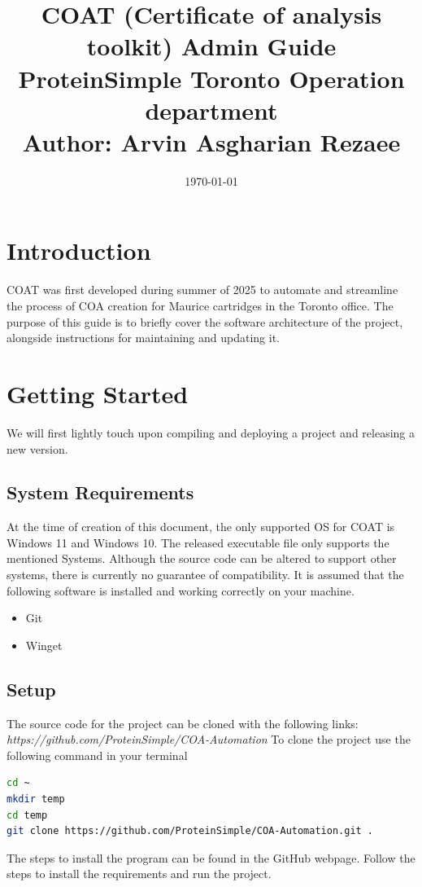 \documentclass[12pt,a4paper]{article}
\title{
  \Huge \textbf{
    COAT (Certificate of analysis toolkit) Admin Guide} \\
    \vspace{1em}
  \large ProteinSimple Toronto Operation department \\
  \large Author: Arvin Asgharian Rezaee
  }
\author{}
\date{\today}
\begin{document}
\maketitle
\thispagestyle{empty}
\clearpage

\tableofcontents
\clearpage

\section{Introduction}
COAT was first developed during summer of 2025 to automate and streamline the process of COA creation
for Maurice cartridges in the Toronto office. The purpose of this guide is to briefly cover the 
software architecture of the project, alongside instructions for maintaining and updating it.
\section{Getting Started}
We will first lightly touch upon compiling and deploying a project and releasing a new version.
\subsection{System Requirements}
At the time of creation of this document, the only supported OS for COAT is Windows 11 and Windows 10.
The released executable file only supports the mentioned Systems. Although the source code can be altered
to support other systems, there is currently no guarantee of compatibility. It is assumed that the
following software is installed and working correctly on your machine.
\begin{itemize}
  \item Git
  \item Winget
\end{itemize}

\subsection{Setup}
The source code for the project can be cloned with the following links: \newline
\textit{https://github.com/ProteinSimple/COA-Automation} \newline
To clone the project use the following command in your terminal
\begin{lstlisting}[language=bash]
cd ~
mkdir temp
cd temp
git clone https://github.com/ProteinSimple/COA-Automation.git .
\end{lstlisting}
The steps to install the program can be found in the GitHub webpage. Follow the steps to install the requirements
and run the project. 
\end{document}
